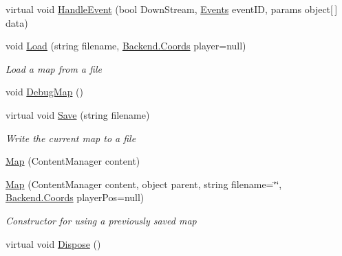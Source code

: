 \begin{DoxyCompactItemize}
virtual void \hyperlink{class_gruppe22_1_1_backend_1_1_map_af3d260b8e5fb50958d07d99e171891d1}{Handle\-Event} (bool Down\-Stream, \hyperlink{namespace_gruppe22_1_1_backend_ab56df91bb0bdafa1ea978e552209ce73}{Events} event\-I\-D, params object\mbox{[}$\,$\mbox{]} data)
\item 
void \hyperlink{class_gruppe22_1_1_backend_1_1_map_ae5bf2ecbd364c82ae01c10b33ad8350a}{Load} (string filename, \hyperlink{class_gruppe22_1_1_backend_1_1_coords}{Backend.\-Coords} player=null)
\begin{DoxyCompactList}\small\item\em Load a map from a file \end{DoxyCompactList}\item 
void \hyperlink{class_gruppe22_1_1_backend_1_1_map_af5841f0eb6d27b7196056cfea1097141}{Debug\-Map} ()
\item 
virtual void \hyperlink{class_gruppe22_1_1_backend_1_1_map_ab1fe0990776579437497c699222253db}{Save} (string filename)
\begin{DoxyCompactList}\small\item\em Write the current map to a file \end{DoxyCompactList}\item 
\hyperlink{class_gruppe22_1_1_backend_1_1_map_ae43adfadc340541f54d6584f6851eb8e}{Map} (Content\-Manager content)
\item 
\hyperlink{class_gruppe22_1_1_backend_1_1_map_aa498945697ea3156633c5f1243fa2adc}{Map} (Content\-Manager content, object parent, string filename=\char`\"{}\char`\"{}, \hyperlink{class_gruppe22_1_1_backend_1_1_coords}{Backend.\-Coords} player\-Pos=null)
\begin{DoxyCompactList}\small\item\em Constructor for using a previously saved map \end{DoxyCompactList}\item 
virtual void \hyperlink{class_gruppe22_1_1_backend_1_1_map_a1a656c9f7104699b2736fdcc156615d3}{Dispose} ()
\end{DoxyCompactItemize}
